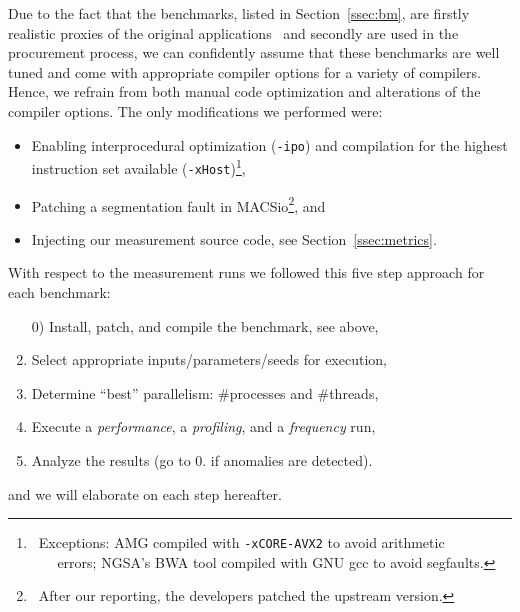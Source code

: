 Due to the fact that the benchmarks, listed in Section~\ref{ssec:bm}, are firstly realistic proxies of the
original applications~\cite{aaziz_methodology_2018} and secondly are used in the procurement process, we can confidently assume
that these benchmarks are well tuned and come with appropriate compiler options for a variety of compilers.
Hence, we refrain from both manual code optimization and alterations of the compiler options.
%
%
The only modifications we performed were:
\begin{itemize}
    \item Enabling interprocedural optimization (\texttt{-ipo}) and compilation for the highest instruction set available (\texttt{-xHost})\footnote{~Exceptions: AMG compiled with \texttt{-xCORE-AVX2} to avoid arithmetic \\$~~~\,\quad$errors; NGSA's BWA tool compiled with GNU gcc to avoid segfaults.},
    \item Patching a segmentation fault in MACSio\footnote{~After our reporting, the developers patched the upstream version.}, and
    \item Injecting our measurement source code, see Section~\ref{ssec:metrics}.
\end{itemize}
%
With respect to the measurement runs we followed this five step approach for each benchmark:
\begin{enumerate}
    \item[0)] Install, patch, and compile the benchmark, see above, 
    \item Select appropriate inputs/parameters/seeds for execution,
    \item Determine ``best'' parallelism: \#processes and \#threads,
    \item Execute a \textit{performance}, a \textit{profiling}, and a \textit{frequency} run,
    \item Analyze the results (go to 0. if anomalies are detected).
\end{enumerate}
and we will elaborate on each step hereafter.

